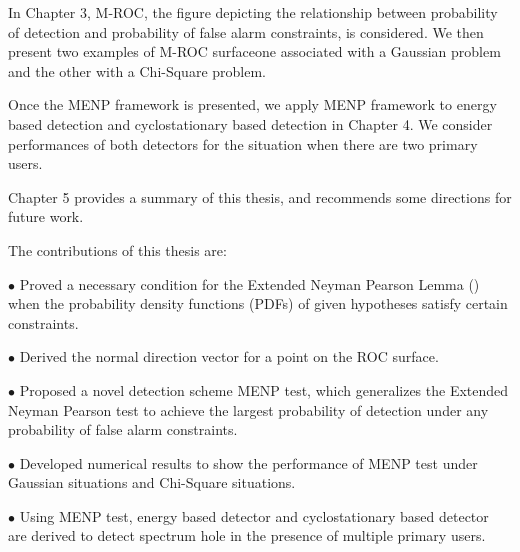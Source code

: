 In Chapter 3, M-ROC, the figure depicting the relationship between probability of detection and probability of false alarm constraints, is considered.  We then present two examples of M-ROC surfaceone associated with a Gaussian problem and the other with a Chi-Square problem. 

Once the MENP framework is presented, we apply MENP framework to energy based detection and cyclostationary based detection in Chapter 4. We consider  performances of both detectors for the situation when there are two primary users.  

Chapter 5 provides a summary of this thesis, and recommends some directions for future work.  

The contributions of this thesis are:

$\bullet$ Proved a necessary condition for the Extended Neyman Pearson Lemma () when the probability density functions (PDFs) of given hypotheses satisfy certain constraints. 

$\bullet$ Derived the normal direction vector for a point on the ROC surface. 

$\bullet$ Proposed a novel detection scheme MENP test, which generalizes the Extended Neyman Pearson test to  achieve the largest probability of detection under any probability of false alarm constraints. 

$\bullet$ Developed numerical results to show the performance of MENP test under Gaussian situations and Chi-Square situations. 

$\bullet$ Using MENP test, energy based detector and cyclostationary based detector are derived to detect spectrum hole in the presence of multiple primary users. 
